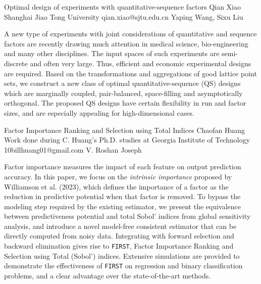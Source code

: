 \begin{talk}
  {Optimal design of experiments with quantitative-sequence factors}%
  {Qian Xiao}%
  {Shanghai Jiao Tong University}%
  {qian.xiao@sjtu.edu.cn}%
  {Yaping Wang, Sixu Liu}%
  
    
   
A new type of experiments with joint considerations of quantitative and sequence factors are recently drawing much attention in medical science, bio-engineering and many other disciplines. The input spaces of such experiments are semi-discrete and often very large. Thus, efficient and economic experimental designs are required. Based on the transformations and aggregations of good lattice point sets, we construct a new class of optimal quantitative-sequence (QS) designs which are marginally coupled, pair-balanced, space-filling and asymptotically orthogonal. The proposed QS designs have certain flexibility in run and factor sizes, and are especially appealing for high-dimensional cases.

\end{talk}

\begin{talk}
  {Factor Importance Ranking and Selection using Total Indices}%
  {Chaofan Huang}%
  {Work done during C. Huang's Ph.D. studies at Georgia Institute of Technology}%
  {10billhuang01@gmail.com}%
  {V. Roshan Joseph}%
  
    
   
Factor importance measures the impact of each feature on output prediction accuracy. In this paper, we focus on the \emph{intrinsic importance} proposed by Williamson et al. (2023), which defines the importance of a factor as the reduction in predictive potential when that factor is removed. To bypass the modeling step required by the existing estimator, we present the equivalence between predictiveness potential and total Sobol' indices from global sensitivity analysis, and introduce a novel model-free consistent estimator that can be directly computed from noisy data. Integrating with forward selection and backward elimination gives rise to \texttt{FIRST}, Factor Importance Ranking and Selection using Total (Sobol') indices. Extensive simulations are provided to demonstrate the effectiveness of \texttt{FIRST} on regression and binary classification problems, and a clear advantage over the state-of-the-art methods.
\end{talk}

